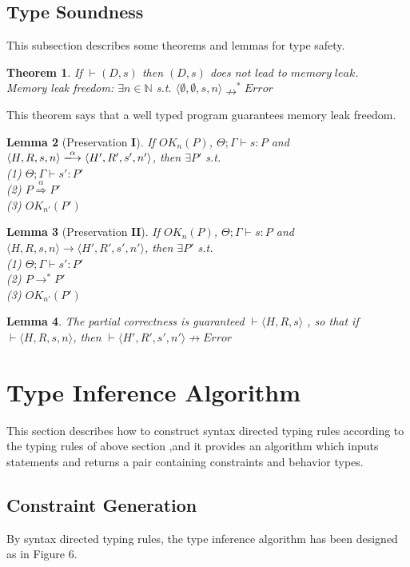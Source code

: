 \documentclass[english]{jssst_ppl} %
\newtheorem{theorem}{Theorem}[section]
\newtheorem{lemma}[theorem]{Lemma}
\theoremstyle{definition}
\begin{document}
\subsection{Type Soundness}
This subsection describes some theorems and lemmas for type safety.
\begin{theorem}\label{thm1}
If $\vdash (D, s)$ then $(D, s)$ does not lead to $memory\;leak$.\\
Memory leak freedom: $\exists n \in \mathbb{N}$ s.t.
$\langle \emptyset, \emptyset, s, n \rangle \nrightarrow^{*}Error$
\end{theorem}
\noindent
This theorem says that a well typed program guarantees memory leak freedom.
\begin{lemma}[Preservation $\mathbf{I}$]%
If $OK_{n}(P)$, $\Theta; \Gamma \vdash s : P$ and $\langle H,R,s, n \rangle
\xlongrightarrow{\alpha}\langle H',R',s', n'
\rangle$, then $\exists P'$ s.t. \\
(1) $ \Theta; \Gamma \vdash s' : P' $ \\
(2) $ P \overset{\text{$\alpha$}}{\Longrightarrow} P'$\\
(3) $ OK_{n'}(P') $
\end{lemma}
\begin{lemma}[Preservation $\mathbf{II}$]%
If $OK_{n}(P)$, $\Theta ; \Gamma \vdash s : P$ and $\langle H,R,s,n \rangle
\rightarrow \langle H',R',s', n'
\rangle$, then $\exists P'$ s.t. \\
(1) $\Theta; \Gamma \vdash s' : P'$\\
(2) $ P \rightarrow^{*} P'  $\\
(3) $OK_{n'}(P')$
\end{lemma}
\begin{lemma}%
 The partial correctness is guaranteed $\vdash \langle H,R,s \rangle$ , so that if $\vdash \langle H,R,s,n \rangle$, then $\vdash \langle H',R',s',n' \rangle \nrightarrow Error$
\end{lemma}
\section{Type Inference Algorithm}
This section describes how to construct syntax directed typing rules according to the typing rules of above section ,and it provides an algorithm which inputs statements and returns a pair containing constraints and behavior types.
\subsection{Constraint Generation}
By syntax directed typing rules, the type inference algorithm has been designed as in Figure 6.
\end{document}

